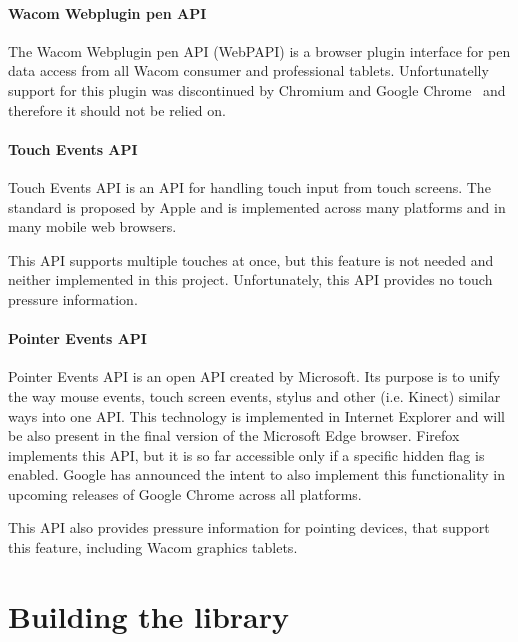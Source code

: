 \paragraph{Wacom Webplugin pen API}
The Wacom Webplugin pen API (WebPAPI) is a browser plugin interface for pen data access from all Wacom consumer and professional tablets. Unfortunatelly support for this plugin was discontinued by Chromium and Google Chrome~\cite{wacom_discontinued} and therefore it should not be relied on.

\paragraph{Touch Events API}
Touch Events API is an API for handling touch input from touch screens. The standard is proposed by Apple and is implemented across many platforms and in many mobile web browsers.

This API supports multiple touches at once, but this feature is not needed and neither implemented in this project. Unfortunately, this API provides no touch pressure information.

\paragraph{Pointer Events API}
Pointer Events API is an open API created by Microsoft. Its purpose is to unify the way mouse events, touch screen events, stylus and other (i.e. Kinect) similar ways into one API. This technology is implemented in Internet Explorer and will be also present in the final version of the Microsoft Edge browser. Firefox implements this API, but it is so far accessible only if a specific hidden flag is enabled. Google has announced the intent to also implement this functionality in upcoming releases of Google Chrome across all platforms.

This API also provides pressure information for pointing devices, that support this feature, including Wacom graphics tablets.















\section{Building the library}
\label{sec:building_the_library}

